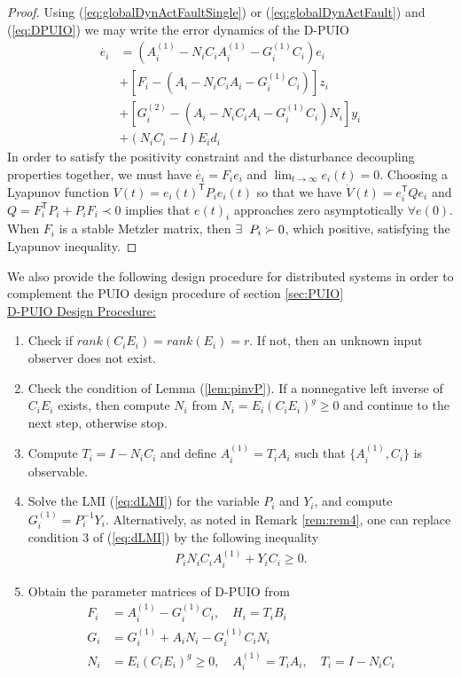 \documentclass[letterpaper, 10 pt, conference]{ieeeconf}  %
\def\tT{\mathsf{T}} %
\begin{document}
\begin{proof}
Using (\ref{eq:globalDynActFaultSingle}) or (\ref{eq:globalDynActFault}) and (\ref{eq:DPUIO}) we may write the error dynamics of the D-PUIO
\begin{align*}
\dot{e_i}&=(A_i^{(1)}-N_iC_iA_i^{(1)}-G_i^{(1)} C_i)e_i \\ 
&+[F_i-(A_i-N_iC_iA_i-G_i^{(1)}C_i)]z_i \\ &+ [G_i^{(2)}-(A_i-N_iC_iA_i-G_i^{(1)}C_i)N_i]y_i \\
&+(N_iC_i-I)E_id_i 
\end{align*}
In order to satisfy the positivity constraint and the disturbance decoupling properties together, we must have $\dot{e_i}=F_ie_i$ and $\displaystyle \lim_{t \rightarrow \infty} e_i(t) = 0$. 
Choosing a Lyapunov function $V(t) = e_i(t)^{\tT} P_i e_i(t)$ so that we have $\dot{V}(t) = e_i^{\tT}Qe_i$ and $Q=F_i^{\tT} P_i + P_iF_i \prec 0$ implies that $e(t)_i$ approaches zero asymptotically $\forall e(0)$.  When $F_i$ is a stable Metzler matrix, then $\exists \hspace{2mm} P_i \succ 0$, which positive, satisfying the Lyapunov inequality.
\end{proof}
We also provide the following design procedure for distributed systems in order to complement the PUIO design procedure of section \ref{sec:PUIO}\\
\underline{D-PUIO Design Procedure:}
    \begin{enumerate}
    \item Check if $rank(C_iE_i) = rank(E_i)= r$.  If not, then an unknown input observer does not exist.  
    \item Check the condition of Lemma (\ref{lem:pinvP}). If a nonnegative left inverse of $C_iE_i$ exists, then compute $N_i$ from $ N_i = E_i(C_iE_i)^g \geq 0$ and continue to the next step, otherwise stop.
    \item Compute $T_i=I-N_iC_i$ and define $A_i^{(1)} = T_iA_i$ such that $\{A_i^{(1)},C_i\}$ is observable.
    \item Solve the LMI (\ref{eq:dLMI}) for the variable $P_i$ and $Y_i$, and compute $G_i^{(1)} = P_i^{-1}Y_i$. Alternatively, as noted in Remark \ref{rem:rem4}, one can replace condition 3 of (\ref{eq:dLMI}) by the following inequality
    \begin{align}
    P_i N_i C_i A_i^{(1)}+Y_iC_i \geq 0.
    \end{align}
    \item Obtain the parameter matrices of D-PUIO from 
   \begin{align*}
    F_i &= A_i^{(1)} - G_i^{(1)} C_i, \quad H_i = T_iB_i \\
    G_i &= G_i^{(1)} +A_i N_i - G_i^{(1)} C_i N_i \\
    N_i &= E_i(C_iE_i)^g \geq 0, \quad A_i^{(1)} = T_iA_i, \quad T_i=I-N_iC_i
   \end{align*}
 \end{enumerate}
\end{document}
